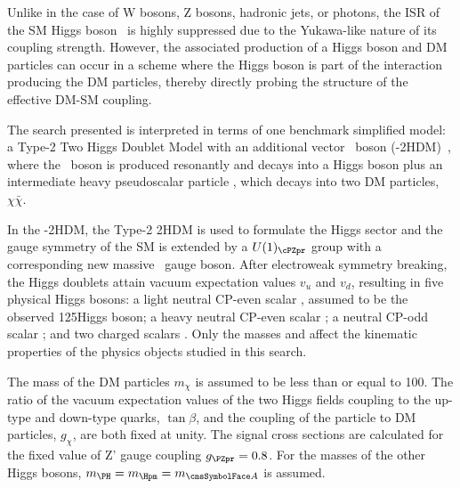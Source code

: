 Unlike in the case of W bosons, Z bosons, hadronic jets, or photons, the ISR of the SM Higgs boson~\cite{HiggsObs_ATLAS, HiggsObs_CMS, HiggsObs_CMS_Long} is highly suppressed due to the Yukawa-like nature of its coupling strength.
However, the associated production of a Higgs boson and DM particles
can occur in a scheme where the
Higgs boson is part of the interaction producing the DM particles,
thereby directly probing the structure of the effective DM-SM coupling.

The search presented is interpreted in terms of one benchmark simplified model: a Type-2 Two Higgs Doublet Model with an additional 
vector \cPZpr~boson (\cPZpr-2HDM)~\cite{2HDM,Lee:1973iz,Branco:2011iw}, where the \cPZpr\ boson is produced resonantly and decays into a Higgs boson plus an intermediate heavy pseudoscalar particle \Az, which decays into two DM particles, $\chi\bar{\chi}$.

In the \cPZpr-2HDM, the Type-2 2HDM is used to formulate 
the Higgs sector and the gauge symmetry of the SM is extended by a
$U(1)_{\cPZpr}$ group with a corresponding new massive \cPZpr\ gauge boson.
After electroweak symmetry breaking, the Higgs doublets attain vacuum
expectation values $v_u$ and $v_d$,
resulting in five physical Higgs bosons:
a light neutral CP-even scalar \Ph, assumed to be the
observed 125\GeV Higgs boson; a heavy neutral CP-even scalar \PH;
a neutral CP-odd scalar \Az; and two charged scalars \Hpm. Only the masses \maz and \mzp affect the kinematic
properties of the physics objects studied in this search.

The mass of the DM particles $m_{\chi}$
is assumed to be less than or equal to 100\GeV. The 
ratio of the vacuum expectation values of the two Higgs fields coupling to the up-type and down-type
quarks, $\tan\beta$, and the coupling of the \Az particle to DM
particles, $g_{\chi}$, are both fixed at unity. 
The signal cross sections are calculated for the fixed value of Z' gauge coupling $\gzp = 0.8$.
For the masses of the other Higgs bosons, $m_{\PH}=m_{\Hpm}=m_{\Az}$ is assumed.

